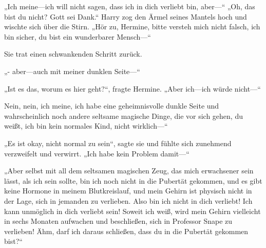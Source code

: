 „Ich meine—ich will nicht sagen, dass ich in dich verliebt bin, aber—“
„Oh, das bist du nicht? Gott sei Dank.“
Harry zog den Ärmel seines Mantels hoch und wischte sich über die Stirn.
„Hör zu, Hermine, bitte versteh mich nicht falsch, ich bin sicher, du bist ein wunderbarer Mensch—“

Sie trat einen schwankenden Schritt zurück.

„- aber—auch mit meiner dunklen Seite—“

„Ist es das, worum es hier geht?“, fragte Hermine. „Aber ich—ich würde nicht—“

Nein, nein, ich meine, ich habe eine geheimnisvolle dunkle Seite und wahrscheinlich noch andere seltsame magische Dinge, die vor sich gehen, du weißt, ich bin kein normales Kind, nicht wirklich—“

„Es ist okay, nicht normal zu sein“, sagte sie und fühlte sich zunehmend verzweifelt und verwirrt. „Ich habe kein Problem damit—“

„Aber selbst mit all dem seltsamen magischen Zeug, das mich erwachsener sein lässt, als ich sein sollte, bin ich noch nicht in die Pubertät gekommen, und es gibt keine Hormone in meinem Blutkreislauf, und mein Gehirn ist physisch nicht in der Lage, sich in jemanden zu verlieben. Also bin ich nicht in dich verliebt! Ich kann unmöglich in dich verliebt sein! Soweit ich weiß, wird mein Gehirn vielleicht in sechs Monaten aufwachen und beschließen, sich in Professor Snape zu verlieben! Ähm, darf ich daraus schließen, dass du in die Pubertät gekommen bist?“

